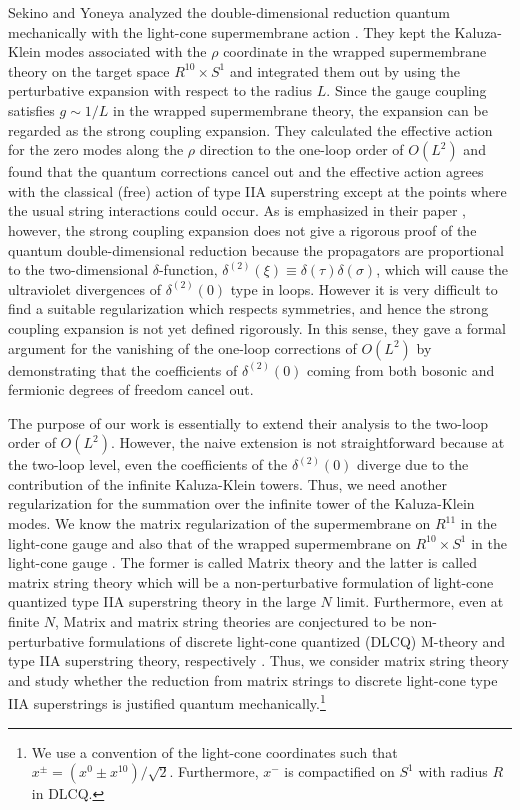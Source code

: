 \documentclass[a4paper,12pt]{article}
\begin{document}
Sekino and Yoneya analyzed the double-dimensional reduction quantum
mechanically with the light-cone supermembrane action \cite{SY}.
They kept the Kaluza-Klein modes associated with the $\rho$ coordinate
in the wrapped supermembrane theory on the target space $R^{10}\times
S^1$ and integrated them out by using the perturbative expansion with
respect to the radius $L$.
Since the gauge coupling satisfies $g\sim 1/L$ in the wrapped
supermembrane theory, the expansion can be regarded as the strong
coupling expansion.
They calculated the effective action for the zero modes along the
$\rho$ direction to the one-loop order of $O(L^2)$  and found
that the quantum corrections cancel out and the effective action
agrees with the classical (free) action of type IIA superstring except
at the points where the usual string interactions could occur.
As is emphasized in their paper \cite{SY}, however, the strong
coupling expansion does not give a rigorous proof of the quantum
double-dimensional reduction because the propagators are proportional
to the two-dimensional $\delta$-function, $\delta^{(2)}(\xi) \equiv
\delta(\tau)\delta(\sigma)$, which will cause the ultraviolet
divergences of $\delta^{(2)}(0)$ type in loops.
However it is very difficult to find a suitable regularization which
respects symmetries, and hence the strong coupling expansion is not
yet defined rigorously.
In this sense, they gave a formal argument for the vanishing of the
one-loop corrections of $O(L^2)$ by demonstrating that the
coefficients of $\delta^{(2)}(0)$ coming from both bosonic and
fermionic degrees of freedom cancel out.

The purpose of our work is essentially to extend their analysis to the
two-loop order of $O(L^2)$.
However, the naive extension is not straightforward because at the
two-loop level, even the coefficients of the $\delta^{(2)}(0)$ diverge
due to the contribution of the infinite Kaluza-Klein towers.
Thus, we need another regularization for the summation over the
infinite tower of the Kaluza-Klein modes.
We know the matrix regularization of the supermembrane on
$R^{11}$ in the light-cone gauge \cite{dHN} and also that of the
wrapped supermembrane on $R^{10} \times S^1$ in the light-cone gauge
\cite{SY}.
The former is called Matrix theory \cite{BFSS} and the latter is
called matrix string theory \cite{Mot,DVV} which will be a
non-perturbative formulation of light-cone quantized type IIA
superstring theory in the large $N$ limit. Furthermore,
even at finite $N$, Matrix and matrix string theories
are conjectured to be non-perturbative formulations of discrete
light-cone quantized (DLCQ) M-theory and type IIA superstring theory,
respectively \cite{Sus,Sei,Sen}.
Thus, we consider matrix string theory and study whether
the reduction from matrix strings to discrete light-cone type IIA
superstrings is justified quantum mechanically.\footnote{We use a
convention of the light-cone coordinates such that $x^{\pm}=(x^{0}\pm
x^{10})/\sqrt 2$. Furthermore, $x^-$ is compactified on $S^1$ with
radius $R$ in DLCQ.}
\end{document}
